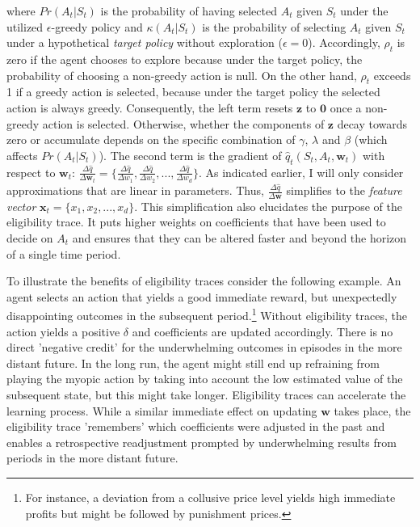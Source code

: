 where $Pr(A_t|S_t)$ is the probability of having selected $A_t$ given $S_t$ under the utilized $\epsilon$-greedy policy and $\kappa(A_t|S_t)$ is the probability of selecting $A_t$ given $S_t$ under a hypothetical \emph{target policy} without exploration ($\epsilon = 0$). Accordingly, $\rho_t$ is zero if the agent chooses to explore because under the target policy, the probability of choosing a non-greedy action is null. On the other hand, $\rho_t$ exceeds 1 if a greedy action is selected, because under the target policy the selected action is always greedy. Consequently, the left term resets $\boldsymbol{z}$ to $\boldsymbol{0}$ once a non-greedy action is selected. Otherwise, whether the components of $\boldsymbol{z}$ decay towards zero or accumulate depends on the specific combination of $\gamma$, $\lambda$ and $\beta$ (which affects $Pr(A_t|S_t)$). The second term is the gradient of $\hat{q}_t(S_t, A_t, \boldsymbol{w}_t)$ with respect to $\boldsymbol{w}_t$:
$\frac{\Delta \hat{q}}{\Delta \boldsymbol{w}_t} =
\{ \frac{\Delta \hat{q}}{\Delta w_1},
\frac{\Delta \hat{q}}{\Delta w_2},
...,
\frac{\Delta \hat{q}}{\Delta w_d}  \}$. As indicated earlier, I will only consider approximations that are linear in parameters. Thus, $\frac{\Delta \hat{q}}{\Delta \boldsymbol{w}}$ simplifies to the \emph{feature vector} $\boldsymbol{x}_t = \{x_1, x_2, ..., x_d\}$. This simplification also elucidates the purpose of the eligibility trace. It puts higher weights on coefficients that have been used to decide on $A_t$ and ensures that they can be altered faster and beyond the horizon of a single time period.

To illustrate the benefits of eligibility traces consider the following example. An agent selects an action that yields a good immediate reward, but unexpectedly disappointing outcomes in the subsequent period.\footnote{For instance, a deviation from a collusive price level yields high immediate profits but might be followed by punishment prices.} Without eligibility traces, the action yields a positive $\delta$ and coefficients are updated accordingly. There is no direct 'negative credit' for the underwhelming outcomes in episodes in the more distant future. In the long run, the agent might still end up refraining from playing the myopic action by taking into account the low estimated value of the subsequent state, but this might take longer. Eligibility traces can accelerate the learning process. While a similar immediate effect on updating $\boldsymbol{w}$ takes place, the eligibility trace 'remembers' which coefficients were adjusted in the past and enables a retrospective readjustment prompted by underwhelming results from periods in the more distant future. 


